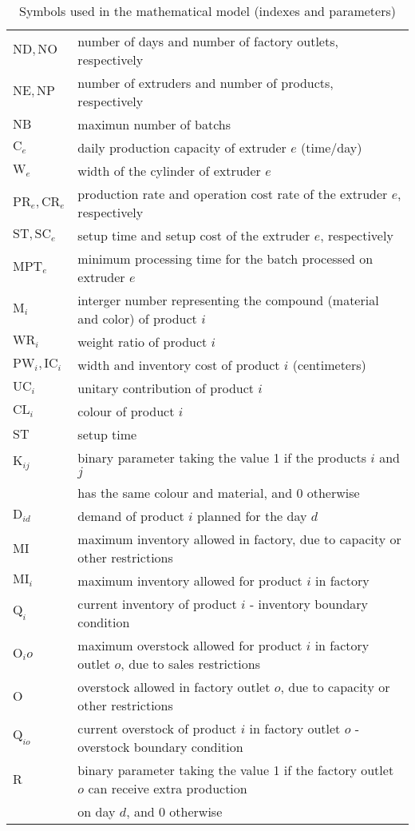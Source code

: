 \begin{table}[h!]
\begin{center}
\begin{tabular}{ l l }
		$\mathrm{ND}, \mathrm{NO}$ & number of days and number of factory outlets, respectively\\
		$\mathrm{NE}, \mathrm{NP}$ & number of extruders and number of products, respectively \\ 
		$\mathrm{NB}$ & maximun number of batchs \\ 
		$\mathrm{C}_e$ & daily production capacity of extruder $e$ (time/day)\\ 
		$\mathrm{W}_e$ & width of the cylinder of extruder $e$ \\ 
		$\mathrm{PR}_e, \mathrm{CR}_e$ & production rate and operation cost rate of the extruder $e$, respectively \\ 
		$\mathrm{ST}, \mathrm{SC}_e$ & setup time and setup cost of the extruder $e$, respectively\\ 
		$\mathrm{MPT}_e$ & minimum processing time for the batch processed on extruder $e$ \\ 
		$\mathrm{M}_i$ & interger number representing the compound (material and color) of product $i$ \\ 
		$\mathrm{WR}_i$ & weight ratio of product $i$\\ 
		$\mathrm{PW}_i, \mathrm{IC}_i$ & width and inventory cost of product $i$ (centimeters) \\ 
		$\mathrm{UC}_i$ & unitary contribution of product $i$ \\ 
		$\mathrm{CL}_i$ & colour of product $i$ \\ 
		$\mathrm{ST}$ & setup time \\
		$\mathrm{K}_{ij}$ & binary parameter taking the value 1 if the products $i$ and $j$ \\
		& has the same colour and material, and 0 otherwise \\
		$\mathrm{D}_{id}$ & demand of product $i$ planned for the day $d$ \\ 
		$\mathrm{MI}$ & maximum inventory allowed in factory, due to capacity or other restrictions \\ 
		$\mathrm{MI}_i$ & maximum inventory allowed for product $i$ in factory \\ 
		$\mathrm{Q}_i$ & current inventory of product $i$ - inventory boundary condition \\ 
		$\mathrm{O}_io$ & maximum overstock allowed for product $i$ in factory outlet $o$, due to sales restrictions \\ 
		$\mathrm{O}$ & overstock allowed in factory outlet $o$, due to capacity or other restrictions  \\ 
		$\mathrm{Q}_{io}$ & current overstock of product $i$ in factory outlet $o$ - overstock boundary condition \\ 
		$\mathrm{R}$ & binary parameter taking the value 1 if the factory outlet $o$ can receive extra production \\ 
		             & on day $d$, and 0 otherwise \\ 
	\end{tabular}
\caption{Symbols used in the mathematical model (indexes and parameters)}
\label{tab:symbols1}
\end{center}
\end{table}

